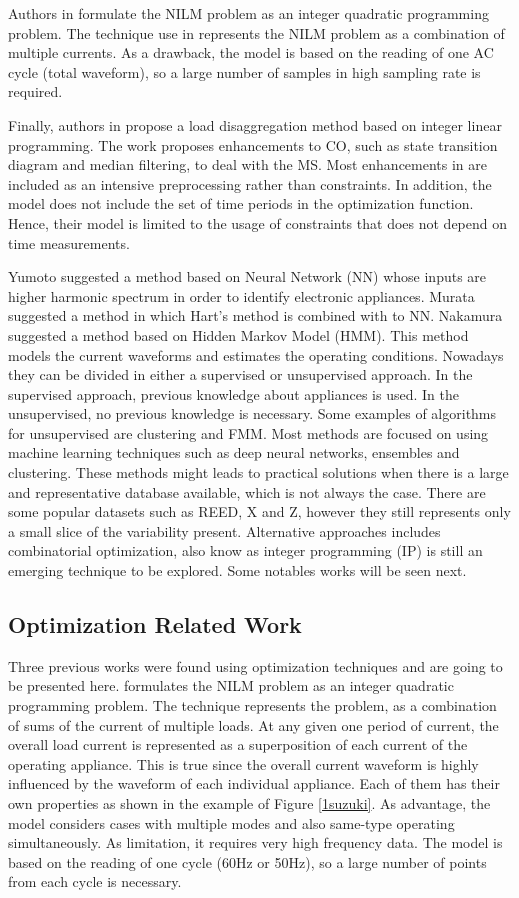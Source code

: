 Authors in \cite{suzuki} formulate the NILM problem as an integer quadratic programming problem. The technique use in \cite{suzuki} represents the NILM problem as a combination of multiple currents. As a drawback, the model is based on the reading of one AC cycle (total waveform), so a large number of samples in high sampling rate is required.

Finally, authors in \cite{bhotto2016} propose a load disaggregation method based on integer linear programming. The work proposes enhancements to CO, such as state transition diagram and median filtering, to deal with the MS. Most enhancements in \cite{bhotto2016} are included as an intensive preprocessing rather than constraints. In addition, the model does not include the set of time periods in the optimization function. Hence, their model is limited to the usage of constraints that does not depend on time measurements.



 Yumoto suggested a method based on Neural Network (NN) whose inputs are higher harmonic spectrum in order to identify electronic appliances. Murata suggested a method in which Hart's method is combined with to NN. Nakamura suggested a method based on Hidden Markov Model (HMM). This method models the current waveforms and estimates the operating conditions. Nowadays they can be divided in either a supervised or unsupervised approach. In the supervised approach, previous knowledge about appliances is used. In the unsupervised, no previous knowledge is necessary. Some examples of algorithms for unsupervised are clustering and FMM. Most methods are focused on using machine learning techniques such as deep neural networks, ensembles and clustering. These methods might leads to practical solutions when there is a large and representative database available, which is not always the case. There are some popular datasets such as REED, X and Z, however they still represents only a small slice of the variability present. Alternative approaches includes combinatorial optimization, also know as integer programming (IP) is still an emerging technique to be explored. Some notables works will be seen next. 

\subsection{Optimization Related Work}
Three previous works were found using optimization techniques and are going to be presented here. \cite{suzuki} formulates the NILM problem as an integer quadratic programming problem. The technique represents the problem, as a combination of sums of the current of multiple loads. 
At any given one period of current, the overall load current is represented as a superposition of each current of the operating appliance. This is true since the overall current waveform is highly influenced by the waveform of each individual appliance. Each of them has their own properties as shown in the example of Figure \ref{1suzuki}. As advantage, the model considers cases with multiple modes and also same-type operating simultaneously. As limitation, it requires very high frequency data. The model is based on the reading of one cycle (60Hz or 50Hz), so a large number of points from each cycle is necessary.


